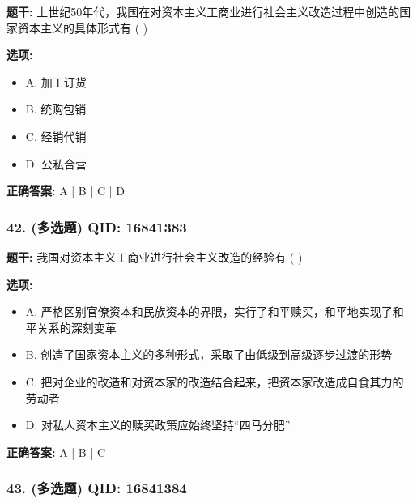 \documentclass[12pt,UTF8]{ctexart}
\begin{document}
\textbf{题干:}
上世纪50年代，我国在对资本主义工商业进行社会主义改造过程中创造的国家资本主义的具体形式有 ( )

\textbf{选项:}
\begin{itemize}[leftmargin=*]

  \item A. 加工订货

  \item B. 统购包销

  \item C. 经销代销

  \item D. 公私合营

\end{itemize}

\textbf{正确答案:}
A | B | C | D

\vspace{0.3em}\hrulefill\vspace{0.7em}

\subsubsection*{42. (多选题) \small QID: 16841383}

\textbf{题干:}
我国对资本主义工商业进行社会主义改造的经验有 ( )

\textbf{选项:}
\begin{itemize}[leftmargin=*]

  \item A. 严格区别官僚资本和民族资本的界限，实行了和平赎买，和平地实现了和平关系的深刻变革

  \item B. 创造了国家资本主义的多种形式，采取了由低级到高级逐步过渡的形势

  \item C. 把对企业的改造和对资本家的改造结合起来，把资本家改造成自食其力的劳动者

  \item D. 对私人资本主义的赎买政策应始终坚持“四马分肥”

\end{itemize}

\textbf{正确答案:}
A | B | C

\vspace{0.3em}\hrulefill\vspace{0.7em}

\subsubsection*{43. (多选题) \small QID: 16841384}
\end{document}
